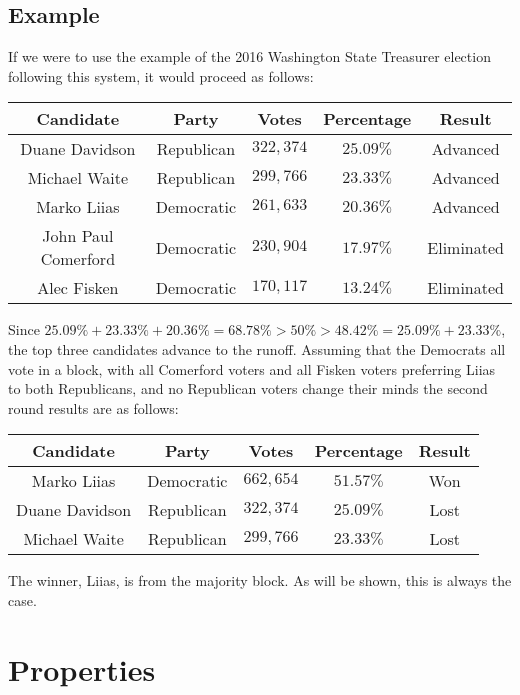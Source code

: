 \documentclass{article}
\begin{document}
\subsection{Example}

If we were to use the example of the 2016 Washington State Treasurer election following this system, it would proceed as follows:
\begin{table}[H]\centering
\begin{tabular}{|c|c|c|c|c|}
\hline\rowcolor{headc}
Candidate & Party & Votes & Percentage & Result\\
\hline\rowcolor{advc}
Duane Davidson & Republican & $322,374$ & $25.09\%$ & Advanced \\
\hline \rowcolor{advc}
Michael Waite & Republican & $299,766$ & $23.33\%$ & Advanced \\
\hline \rowcolor{advc}
Marko Liias & Democratic & $261,633$ & $20.36\%$ & Advanced \\
\hline 
John Paul Comerford & Democratic & $230,904$ & $17.97\%$ & Eliminated\\
\hline 
Alec Fisken & Democratic & $170,117$ & $13.24\%$ & Eliminated\\
\hline
\end{tabular}
\end{table}
Since $25.09\% + 23.33\% + 20.36\% = 68.78\% > 50\% > 48.42\% = 25.09\% + 23.33\%$, the top three candidates advance to the runoff. Assuming that the Democrats all vote in a block, with all Comerford voters and all Fisken voters preferring Liias to both Republicans, and no Republican voters change their minds the second round results are as follows:
\begin{table}[H]\centering
\begin{tabular}{|c|c|c|c|c|}
\hline\rowcolor{headc}
Candidate & Party & Votes & Percentage & Result\\
\hline \rowcolor{advc}
Marko Liias & Democratic & $662,654$ & $51.57\%$ & Won \\
\hline
Duane Davidson & Republican & $322,374$ & $25.09\%$ & Lost \\
\hline
Michael Waite & Republican & $299,766$ & $23.33\%$ & Lost \\
\hline
\end{tabular}
\end{table}
The winner, Liias, is from the majority block. As will be shown, this is always the case.
\section{Properties}
\end{document}
